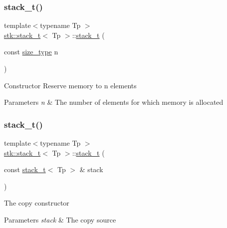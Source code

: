 \subsubsection{\texorpdfstring{stack\+\_\+t()}{stack\_t()}\hspace{0.1cm}{\footnotesize\ttfamily [1/2]}}
{\footnotesize\ttfamily template$<$typename Tp $>$ \\
\hyperlink{classstk_1_1stack__t}{stk\+::stack\+\_\+t}$<$ Tp $>$\+::\hyperlink{classstk_1_1stack__t}{stack\+\_\+t} (\begin{DoxyParamCaption}\item[{const \hyperlink{classstk_1_1stack__t_a591d5ffc540c9f27e5618f9aa4d67cad}{size\+\_\+type}}]{n }\end{DoxyParamCaption})\hspace{0.3cm}{\ttfamily [explicit]}}

Constructor Reserve memory to n elements 
\begin{DoxyParams}{Parameters}
{\em n} & The number of elements for which memory is allocated \\
\hline
\end{DoxyParams}
\mbox{\label{classstk_1_1stack__t_ac5b1b45543c317bead3fe05ba64618ae}} 
\subsubsection{\texorpdfstring{stack\+\_\+t()}{stack\_t()}\hspace{0.1cm}{\footnotesize\ttfamily [2/2]}}
{\footnotesize\ttfamily template$<$typename Tp $>$ \\
\hyperlink{classstk_1_1stack__t}{stk\+::stack\+\_\+t}$<$ Tp $>$\+::\hyperlink{classstk_1_1stack__t}{stack\+\_\+t} (\begin{DoxyParamCaption}\item[{const \hyperlink{classstk_1_1stack__t}{stack\+\_\+t}$<$ Tp $>$ \&}]{stack }\end{DoxyParamCaption})}

The copy constructor 
\begin{DoxyParams}{Parameters}
{\em stack} & The copy source \\
\hline
\end{DoxyParams}
\mbox{\label{classstk_1_1stack__t_a45e9376d38de6b4c43c0edd54138edaa}} 
